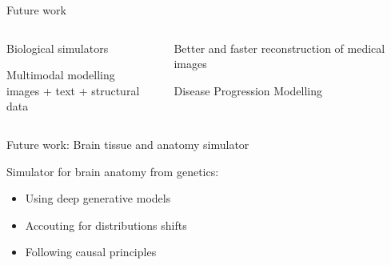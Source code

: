 \documentclass[8pt,xcolor=table,aspectratio=169]{beamer}
\begin{document}
\begin{frame}{Future work}


\vspace{-2em}
\begin{columns}[t]
\begin{column}{0.5\textwidth}
\centering

Biological simulators\\

\vt
\vt

Multimodal modelling\\
images + text + structural data  

\end{column}
\begin{column}{0.5\textwidth}
\centering

Better and faster reconstruction of medical images\\

\vt
\vt

Disease Progression Modelling



\end{column}
\end{columns}


\end{frame}


\begin{frame}{Future work: Brain tissue and anatomy simulator}


Simulator for brain anatomy from genetics:
\begin{itemize}
 \item Using deep generative models
 \item Accouting for distributions shifts
 \item Following causal principles
\end{itemize}

\vt


\end{frame}
\end{document}
